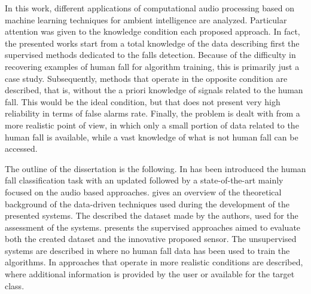 In this work, different applications of computational audio processing based on machine learning techniques for ambient intelligence are analyzed. Particular attention was given to the knowledge condition each proposed approach. In fact, the presented works start from a total knowledge of the data describing first the supervised methods dedicated to the falls detection. Because of the difficulty in recovering examples of human fall for algorithm training, this is primarily just a case study. Subsequently, methods that operate in the opposite condition are described, that is, without the a priori knowledge of signals related to the human fall. This would be the ideal condition, but that does not present very high reliability in terms of false alarms rate. Finally, the problem is dealt with from a more realistic point of view, in which only a small portion of data related to the human fall is available, while a vast knowledge of what is not human fall can be accessed.

The outline of the dissertation is the following.
In  has been introduced the human fall classification task with an updated followed by a state-of-the-art mainly focused on the audio based approaches. 
 gives an overview of the theoretical background of the data-driven techniques used during the development of the presented systems. The  described the dataset made by the authors, used for the assessment of the systems.  presents the supervised approaches aimed to evaluate both the created dataset and the innovative proposed sensor.
The unsupervised systems are described in  where no human fall data has been used to train the algorithms.
In  approaches that operate in more realistic conditions are described, where additional information is provided by the user or available for the target class.

